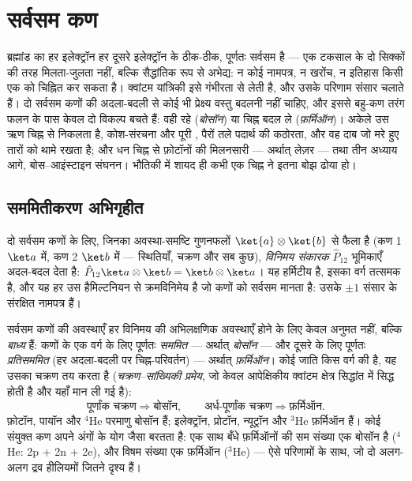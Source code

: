 \chapter{सर्वसम कण}\label{ch:b3:identical-particles}

ब्रह्मांड का हर इलेक्ट्रॉन हर दूसरे इलेक्ट्रॉन के ठीक-ठीक, पूर्णतः
सर्वसम है --- एक टकसाल के दो सिक्कों की तरह मिलता-जुलता नहीं, बल्कि
सैद्धांतिक रूप से अभेद्य: न कोई नामपत्र, न खरोंच, न इतिहास किसी एक को
चिह्नित कर सकता है। क्वांटम यांत्रिकी इसे गंभीरता से लेती है, और उसके
परिणाम संसार चलाते हैं। दो सर्वसम कणों की अदला-बदली से कोई भी प्रेक्ष्य
वस्तु बदलनी नहीं चाहिए, और इससे बहु-कण तरंग फलन के पास केवल दो विकल्प
बचते हैं: वही रहे (\emph{बोसॉन}) या चिह्न बदल ले (\emph{फ़र्मिऑन})।
अकेले उस ऋण चिह्न से  निकलता है, कोश-संरचना
और पूरी , पैरों तले पदार्थ की कठोरता, और वह दाब जो मरे हुए
तारों को थामे रखता है; और धन चिह्न से फ़ोटॉनों की मिलनसारी --- अर्थात्
लेज़र --- तथा तीन अध्याय आगे, बोस--आइंस्टाइन संघनन। भौतिकी में शायद ही
कभी एक चिह्न ने इतना बोझ ढोया हो।

\section{सममितीकरण अभिगृहीत}

\begin{definition}[विनिमय]\label{def:b3:identical-particles:exchange}
दो सर्वसम कणों के लिए, जिनका अवस्था-समष्टि गुणनफलों
$\ket{a}\otimes\ket{b}$ से फैला है (कण 1 $\ket a$ में, कण 2
$\ket b$ में --- स्थितियाँ, चक्रण और सब कुछ), \emph{विनिमय संकारक}
$\hat P_{12}$ भूमिकाएँ अदल-बदल देता है: $\hat P_{12}\ket a\otimes\ket b =
\ket b\otimes\ket a$। यह हर्मिटीय है, इसका वर्ग तत्समक है, और यह हर उस
हैमिल्टनियन से क्रमविनिमेय है जो कणों को सर्वसम मानता है:
उसके  $\pm1$ संसार के संरक्षित नामपत्र हैं।
\end{definition}

\begin{theorem}[बोसॉन और फ़र्मिऑन]\label{thm:b3:identical-particles:postulate}
सर्वसम कणों की अवस्थाएँ हर विनिमय की अभिलक्षणिक अवस्थाएँ होने के लिए
केवल अनुमत नहीं, बल्कि \emph{बाध्य} हैं: कणों के एक वर्ग के लिए पूर्णतः
\emph{सममित} --- अर्थात् \emph{बोसॉन} --- और दूसरे के लिए पूर्णतः
\emph{प्रतिसममित} (हर अदला-बदली पर चिह्न-परिवर्तन) --- अर्थात्
\emph{फ़र्मिऑन}। कोई जाति किस वर्ग की है, यह उसका चक्रण तय करता है
(\emph{चक्रण--सांख्यिकी प्रमेय}, जो केवल आपेक्षिकीय क्वांटम क्षेत्र
सिद्धांत में सिद्ध होती है और यहाँ मान ली गई है):
\[
\text{पूर्णांक चक्रण} \Rightarrow \text{बोसॉन} , \qquad
\text{अर्ध-पूर्णांक चक्रण} \Rightarrow \text{फ़र्मिऑन} .
\]
फ़ोटॉन, पायॉन और $^4$He परमाणु बोसॉन हैं; इलेक्ट्रॉन, प्रोटॉन,
न्यूट्रॉन और $^3$He फ़र्मिऑन हैं।
कोई संयुक्त कण अपने अंगों के योग जैसा बरतता है: एक साथ बँधे फ़र्मिऑनों
की सम संख्या एक बोसॉन है ($^4$He: 2p + 2n + 2e), और विषम संख्या एक
फ़र्मिऑन ($^3$He) --- ऐसे परिणामों के साथ, जो दो अलग-अलग द्रव
हीलियमों जितने दृश्य हैं।
\end{theorem}
\admitted


